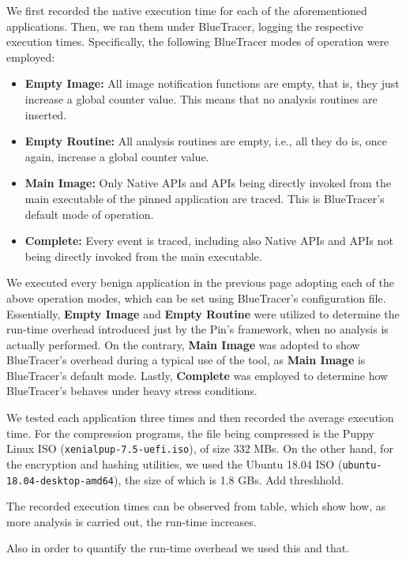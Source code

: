 We first recorded the native execution time for each of the aforementioned applications. Then, we ran them under BlueTracer, logging the respective execution times. Specifically, the following BlueTracer modes of operation were employed:

\begin{itemize}
\item \textbf{Empty Image:} All image notification functions are empty, that is, they just increase a global counter value. This means that no analysis routines are inserted. 
\item \textbf{Empty Routine:} All analysis routines are empty, i.e., all they do is, once again, increase a global counter value.
\item \textbf{Main Image:} Only Native APIs and APIs being directly invoked from the main executable of the pinned application are traced. This is BlueTracer's default mode of operation. 
\item \textbf{Complete:} Every event is traced, including also Native APIs and APIs not being directly invoked from the main executable.
\end{itemize}

We executed every benign application in the previous page adopting each of the above operation modes, which can be set using BlueTracer's configuration file. Essentially, \textbf{Empty Image} and \textbf{Empty Routine} were utilized to determine the run-time overhead introduced just by the Pin's framework, when no analysis is actually performed. On the contrary, \textbf{Main Image} was adopted to show BlueTracer's overhead during a typical use of the tool, as \textbf{Main Image} is BlueTracer's default mode. Lastly, \textbf{Complete} was employed to determine how BlueTracer's behaves under heavy stress conditions.

We tested each application three times and then recorded the average execution time. For the compression programs, the file being compressed is the Puppy Linux ISO (\texttt{xenialpup-7.5-uefi.iso}), of size 332 MBs. On the other hand, for the encryption and hashing utilities, we used the Ubuntu 18.04 ISO (\texttt{ubuntu-18.04-desktop-amd64}), the size of which is 1.8 GBs. Add threshhold.       

The recorded execution times can be observed from table, which show how, as more analysis is carried out, the run-time increases.

Also in order to quantify the run-time overhead we used this and that.

